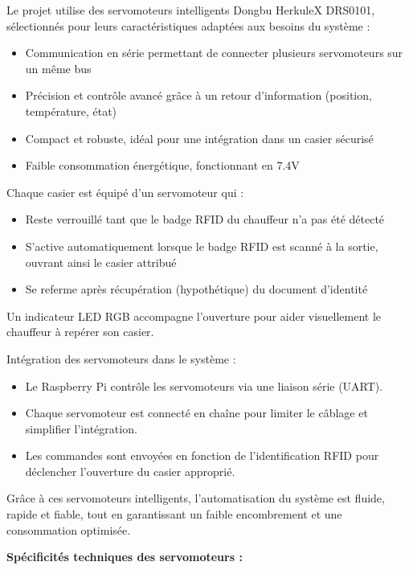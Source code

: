 \documentclass[main.tex]{subfiles}
\begin{document}
Le projet utilise des servomoteurs intelligents Dongbu HerkuleX DRS0101, sélectionnés pour leurs caractéristiques adaptées aux besoins du système :

\begin{itemize}
\item Communication en série permettant de connecter plusieurs servomoteurs sur un même bus
\item Précision et contrôle avancé grâce à un retour d’information (position, température, état)
\item Compact et robuste, idéal pour une intégration dans un casier sécurisé
\item Faible consommation énergétique, fonctionnant en 7.4V
\end{itemize}

Chaque casier est équipé d’un servomoteur qui :

\begin{itemize}
\item Reste verrouillé tant que le badge RFID du chauffeur n’a pas été détecté
\item S’active automatiquement lorsque le badge RFID est scanné à la sortie, ouvrant ainsi le casier attribué
\item Se referme après récupération (hypothétique) du document d’identité
\end{itemize}

Un indicateur LED RGB accompagne l’ouverture pour aider visuellement le chauffeur à repérer son casier.

Intégration des servomoteurs dans le système :

\begin{itemize}
\item Le Raspberry Pi contrôle les servomoteurs via une liaison série (UART).
\item Chaque servomoteur est connecté en chaîne pour limiter le câblage et simplifier l’intégration.
\item Les commandes sont envoyées en fonction de l’identification RFID pour déclencher l’ouverture du casier approprié.
\end{itemize}

Grâce à ces servomoteurs intelligents, l’automatisation du système est fluide, rapide et fiable, tout en garantissant un faible encombrement et une consommation optimisée.

\textbf{Spécificités techniques des servomoteurs :}
\end{document}
